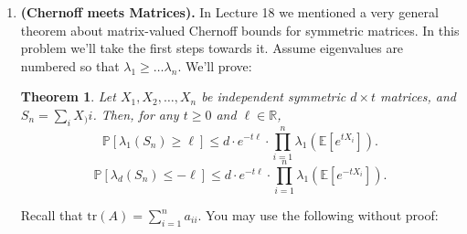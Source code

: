 \documentclass{article}
\theoremstyle{plain}
\newtheorem{theorem}{Theorem}
\newcommand{\E}{\mathbb{E}}
\newcommand{\R}{\mathbb{R}}
\newcommand{\tr}{\mathrm{tr}}
\renewcommand{\P}{\mathbb{P}}
\newcommand\litem[1]{\item{\bfseries#1.\space}}
\begin{document}
\begin{enumerate}
   Keep a global hash function $g : [D] \to [d]$, and also $d$ counters $C_1, C_2,\ldots, C_d$
(initially zero), each with its own hash function $h_i: [D] \to \{-1, +1\}$. If you see
element $e \in [D]$, first hash it using the global hash function $g$ to get the bucket
number $g(e)$, and then update

\[C_{g(e)}\gets   C_{g(e)} + h_{g(e)}(e).\]
When faced with the query $q$, output $A(q) := h_{g(q)}(q) · C_{g(q)}$.

Assume that $g$ and the $h_i$s are all independently picked, and each hash function is itself
$2$-universal.
\begin{enumerate}
\item  Show that $E[A(q)] = x_q$.
\item  Show that the variance of the estimate $A(q) = \frac{1}{d}(F_2 - x^2_q) \leq F_2/d.$
\item  Show that if we set $d =\frac{1}{\epsilon^2 \delta}$, our estimate $A(q)$ satisfies
\[\P[A(q) \in x_q \pm \epsilon \sqrt{F_2}] \geq 1 -\delta.\]
Recall that $F_2 := \sum_i x^2_i = || x||^2_2$  and hence the error term is $\epsilon||x||_2$.

\item Finally, consider an extension of this idea: maintain $t$
  independent copies of the above data structure. On a query for $q$,
  if the answers from the individual copies of the data structure are
  $A_1(q), A_2(q), . . . , A_t(q)$, return the median $M(q)$ of these
  $t$ answers.  Show that with $t = c_1 \log \frac{1+}{\delta}$, and
  $d = \frac{c_2}{\epsilon^2}$, where $c_1, c_2$ are constants you can
  choose, you get $M(q) \in x_q \pm \epsilon || x ||_2$ with
  probability $1-\delta$.
\end{enumerate}

\litem{(Chernoff meets Matrices)} In Lecture 18 we mentioned a very
general theorem about matrix-valued Chernoff bounds for symmetric
matrices. In this problem we’ll take the first steps towards
it. Assume eigenvalues are numbered so that
$\lambda_1 \geq \ldots \lambda_n$. We’ll prove:
\begin{theorem}
  Let $X_1, X_2, \ldots, X_n$ be independent symmetric $d \times t$ matrices, and $S_n= \sum_i X_)i$. Then, for any $t \geq 0$ and $\ell \in \R$,
  \[\P[\lambda_1(S_n) \geq \ell] \leq d \cdot e^{-t\ell} \cdot \prod_{i=1}^n \lambda_1 (\E[e^{tX_i}]).\]
    \[\P[\lambda_d(S_n) \leq -\ell] \leq d \cdot e^{-t\ell} \cdot \prod_{i=1}^n \lambda_1 (\E[e^{-tX_i}]).\]
  \end{theorem}
  Recall that $\tr(A) = \sum_{i=1}^n a_{ii}$. You may use the following without proof:
\begin{enumerate}


\end{enumerate}
\end{enumerate}
\end{document}
